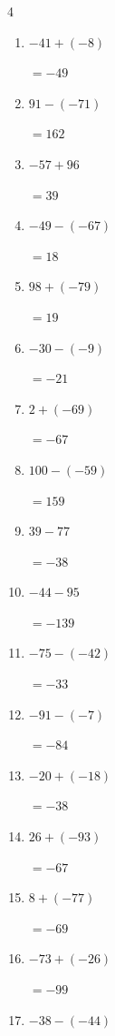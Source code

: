 \begin{multicols}{4}
\begin{enumerate}
  \item $-41+(-8)$

        $=-49$

\columnbreak %

  \item $91-(-71)$

        $=162$

  \item $-57+96$

        $=39$

  \item $-49-(-67)$

        $=18$

  \item $98+(-79)$

        $=19$

  \item $-30-(-9)$

        $=-21$

  \item $2+(-69)$

        $=-67$

  \item $100-(-59)$

        $=159$

  \item $39-77$

        $=-38$

  \item $-44-95$

        $=-139$

  \item $-75-(-42)$

        $=-33$

  \item $-91-(-7)$

        $=-84$

  \item $-20+(-18)$

        $=-38$

  \item $26+(-93)$

        $=-67$

  \item $8+(-77)$

        $=-69$

  \item $-73+(-26)$

        $=-99$

  \item $-38-(-44)$


\end{enumerate}
\end{multicols}

